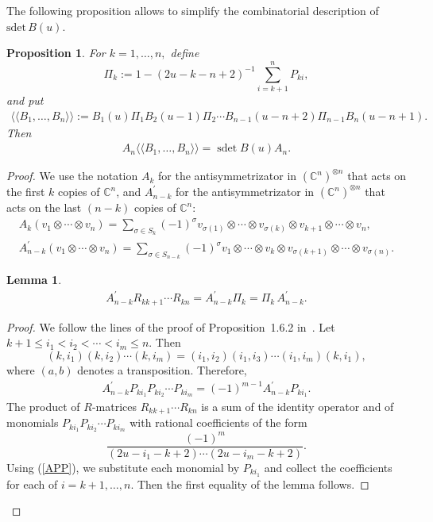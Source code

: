 \documentclass[11pt]{article}
\newtheorem{lemma}{Lemma}
\newtheorem{proposition}{Proposition}
\newcommand{\CC}{\mathbb C}    %
\begin{document}
The following proposition allows to simplify the combinatorial description of $\text{sdet}\, B(u)$.
\begin{proposition} \label{new}
For $k=1,\dots, n,$ define
\[
\Pi_k:=1-{(2u-k-n+2)^{-1}}\sum_{i=k+1}^{n}P_{ki},
\]
and put
\begin{gather*}
\langle \langle B_1,\dots, B_n
\rangle \rangle :=
B_1(u) \Pi_1B_2(u-1)\Pi_2\cdots B_{n-1}(u-n+2)\Pi_{n-1}B_n(u-n+1).
\end{gather*}
Then
\begin{gather*}
A_n\langle \langle B_1,\dots, B_n
\rangle \rangle =\operatorname{sdet}B(u)A_n.
\end{gather*}
\end{proposition}
\begin{proof}
We use the notation  $A_k$  for the antisymmetrizator in  $(\CC^n)^{\otimes n}$ that acts on the f\/irst $k$ copies of $\CC^n$, and
$A^{\prime}_{n-k}$  for  the antisymmetrizator  in   $(\CC^n)^{\otimes n}$ that acts on  the last $(n-k)$ copies of $\CC^n$:
\begin{gather*}
A_k (v_1\otimes \cdots\otimes v_n)=\sum_{\sigma\in S_k} (-1)^{\sigma}
v_{\sigma(1)}\otimes \cdots \otimes  v_{\sigma(k) }\otimes v_{k+1}\otimes\cdots
\otimes v_{n},
\\
A^\prime_{n-k} (v_1\otimes \cdots\otimes v_n)=\sum_{\sigma\in S_{n-k}} (-1)^{\sigma}
v_{1}\otimes \cdots \otimes v_{k }\otimes v_{\sigma(k+1)}\otimes\cdots
\otimes v_{\sigma(n)}.
\end{gather*}


\begin{lemma} \label{lem_ARR}
\begin{gather}\label{ARR}
A^\prime_{n-k} R_{kk+1}\cdots R_{kn} =
A^\prime_{n-k} \Pi_k=
\Pi_k\,A^\prime_{n-k}.
\end{gather}
\end{lemma}
\begin{proof} We follow the lines of the proof of Proposition~1.6.2 in~\cite{Mol1}. Let  $k+1\le i_1< i_2< \cdots < i_m\le n$. Then
\[
(k,i_1)(k,i_2)\cdots (k,i_m)=(i_1,i_2)(i_1,i_3)\cdots (i_{1},i_m)(k,i_1),
\]
where $(a,b)$   denotes  a  transposition.
Therefore,
\begin{gather}\label{APP}
A^\prime_{n-k}P_{ki_1}P_{ki_2}\cdots P_{ki_m}=(-1)^{m-1}A^\prime_{n-k}P_{ki_1}.
\end{gather}
The product of $R$-matrices $R_{kk+1}\cdots R_{kn}$  is a sum of  the identity operator and of monomials $P_{ki_1}P_{ki_2}\cdots P_{ki_m}$ with rational coef\/f\/icients of the form
\[
\frac{(-1)^m}{(2u-i_1-k+2)\cdots (2u-i_m-k+2)}.
\]
Using (\ref{APP}), we substitute each monomial by  $P_{ki_1}$   and   collect the coef\/f\/icients  for each  of $i=k+1,\dots, n$. Then the  f\/irst equality of the lemma follows.



\end{proof}
\end{proof}
\end{document}
